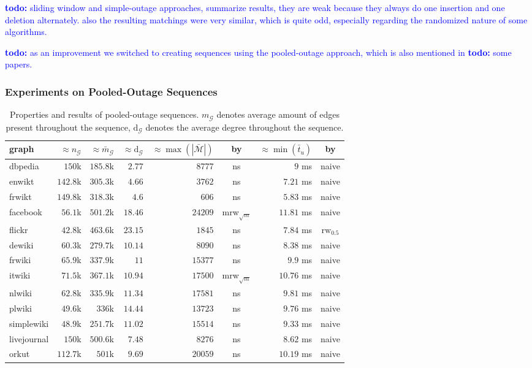 \documentclass{article}      %
\newcommand\todo[1]{\textcolor{blue}{\textbf{todo: }#1}}
\begin{document}
\todo{sliding window and simple-outage approaches, summarize results, they are weak because they always do one insertion and one deletion alternately. also the resulting matchings were very similar, which is quite odd, especially regarding the randomized nature of some algorithms.}

\todo {as an improvement we switched to creating sequences using the pooled-outage approach, which is also mentioned in \todo{some papers}. }

\subsubsection{Experiments on Pooled-Outage Sequences}
\label{sec:exp-pool-out}

\begin{table}
	\centering
	\tiny
	\begin{tabular}{| l || r | r | r || r | c || r | c |}
		\hline
		graph & $\approx n_\mathcal{G}$ & 
			$\approx \bar{m}_\mathcal{G}$ & 
			$\approx \mathrm{d}_\mathcal{G}$ & 
			$\approx \max(|\bar{\mathcal{M}}|)$ & by & 
			$\approx \min(\bar{t}_u)$ & by \\
		\hline
		\hline
		dbpedia & $150$k & $ 185.8$k & $ 2.77$ & $ 8777$ & ns & $ 9$ ms & naive \\
		enwikt& $ 142.8$k & $ 305.3$k & $ 4.66$ & $ 3762$ & ns & $ 7.21$ ms & naive \\
		frwikt & $ 149.8$k & $ 318.3$k & $ 4.6$ & $ 606$ & ns & $ 5.83$ ms & naive \\
		facebook & $ 56.1$k & $ 501.2$k & $ 18.46$ & $ 24209$ & mrw$_{\sqrt{m}}$ & $ 11.81$ ms & naive \\
		flickr & $ 42.8$k & $ 463.6$k & $ 23.15$ & $ 1845$ & ns & $ 7.84$ ms & $\mathrm{rw_{0.5}}$ \\
		dewiki  & $ 60.3$k & $ 279.7$k & $ 10.14$ & $ 8090$ & ns & $ 8.38$ ms & naive \\
		frwiki & $ 65.9$k & $ 337.9$k & $ 11$ & $ 15377$ & ns & $ 9.9$ ms & naive \\
		itwiki & $ 71.5$k & $ 367.1$k & $ 10.94$ & $ 17500$ & mrw$_{\sqrt{m}}$ & $ 10.76$ ms & naive \\
		nlwiki  & $ 62.8$k & $ 335.9$k & $ 11.34$ & $ 17581$ & ns & $ 9.81$ ms & naive \\
		plwiki & $ 49.6$k & $ 336$k & $ 14.44$ & $ 13723$ & ns & $ 9.76$ ms & naive \\
		simplewiki & $ 48.9$k & $ 251.7$k & $ 11.02$ & $ 15514$ & ns & $ 9.33$ ms & naive \\
		livejournal & $ 150$k & $ 500.6$k & $ 7.48$ & $ 8276$ & ns & $ 8.62$ ms & naive \\
		orkut & $ 112.7$k & $ 501$k & $ 9.69$ & $ 20059$ & ns & $ 10.19$ ms & naive \\
		\hline
	\end{tabular}
	\caption{Properties and results of pooled-outage sequences. $m_\mathcal{G}$ denotes average amount of edges present throughout the sequence, $\mathrm{d}_\mathcal{G}$ denotes the average degree throughout the sequence.}
    \label{tab:exp-1}
\end{table}
\end{document}
